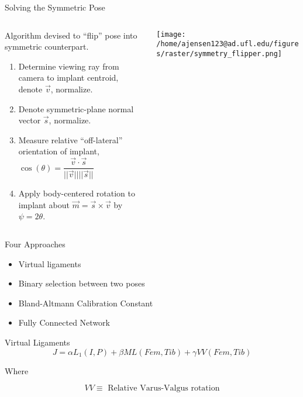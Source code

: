 \documentclass[presentation, aspectratio=1610]{beamer}
\begin{document}
\begin{frame}[label={sec:org2b6a293}]{Solving the Symmetric Pose}
\begin{columns}
\begin{column}{0.5\columnwidth}
Algorithm devised to ``flip'' pose into symmetric counterpart.
\begin{enumerate}
\item Determine viewing ray from camera to implant centroid, denote \(\vec{v}\), normalize.
\item Denote symmetric-plane normal vector \(\vec{s}\), normalize.
\item Measure relative ``off-lateral'' orientation of implant, \(\cos(\theta) = \dfrac{\vec{v} \cdot \vec{s}}{||\vec{v} || ||\vec{s} || }\)
\item Apply body-centered rotation to implant about \(\vec{m} = \vec{s} \times \vec{v}\) by \(\psi = 2\theta\).
\end{enumerate}
\end{column}
\begin{column}{0.6\columnwidth}
\begin{center}
\texttt{[image: /home/ajensen123@ad.ufl.edu/figures/raster/symmetry\_flipper.png]}
\end{center}
\end{column}
\end{columns}
\end{frame}
\begin{frame}[label={sec:orga0d13db}]{Four Approaches}
\begin{itemize}
\item Virtual ligaments
\item Binary selection between two poses
\item Bland-Altmann Calibration Constant
\item Fully Connected Network
\end{itemize}
\end{frame}
\begin{frame}[label={sec:org9c89d99}]{Virtual Ligaments}
\begin{equation*}
  J = \alpha L_{1}(I,P) + \beta ML(Fem,Tib) + \gamma VV(Fem,Tib)
\end{equation*}

Where

\begin{equation*}
  VV \equiv \text{  Relative Varus-Valgus rotation}
\end{equation*}
\end{frame}
\end{document}
